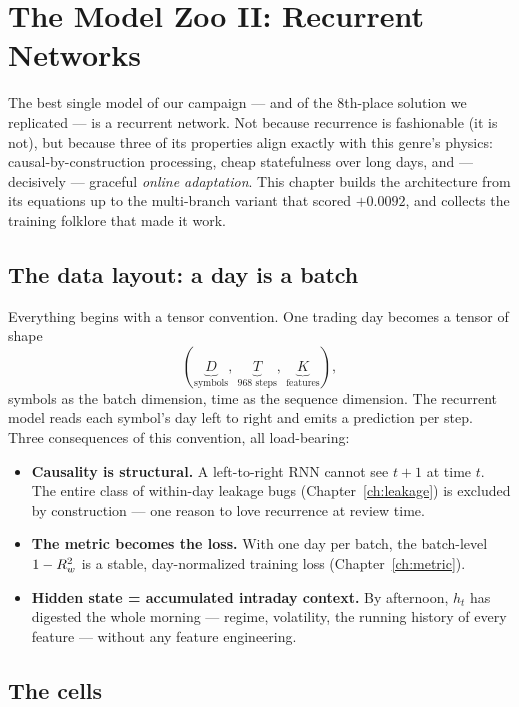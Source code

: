 \chapter{The Model Zoo II: Recurrent Networks}
\label{ch:rnn}

The best single model of our campaign --- and of the 8th-place solution we
replicated --- is a recurrent network. Not because recurrence is
fashionable (it is not), but because three of its properties align exactly
with this genre's physics: causal-by-construction processing, cheap
statefulness over long days, and --- decisively --- graceful \emph{online
adaptation}. This chapter builds the architecture from its equations up to
the multi-branch variant that scored $+0.0092$, and collects the training
folklore that made it work.

\section{The data layout: a day is a batch}

Everything begins with a tensor convention. One trading day becomes a
tensor of shape
\[
(\underbrace{D}_{\text{symbols}},\ \underbrace{T}_{968 \text{ steps}},\
\underbrace{K}_{\text{features}}),
\]
symbols as the batch dimension, time as the sequence dimension. The
recurrent model reads each symbol's day left to right and emits a
prediction per step. Three consequences of this convention, all
load-bearing:

\begin{itemize}
\item \textbf{Causality is structural.} A left-to-right RNN cannot see
  $t+1$ at time $t$. The entire class of within-day leakage bugs
  (Chapter~\ref{ch:leakage}) is excluded by construction --- one reason to
  love recurrence at review time.
\item \textbf{The metric becomes the loss.} With one day per batch, the
  batch-level $1 - R^2_{w}$ is a stable, day-normalized training loss
  (Chapter~\ref{ch:metric}).
\item \textbf{Hidden state = accumulated intraday context.} By afternoon,
  $h_t$ has digested the whole morning --- regime, volatility, the running
  history of every feature --- without any feature engineering.
\end{itemize}

\section{The cells}

